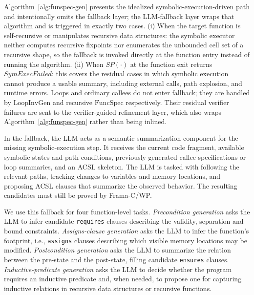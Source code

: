 \label{sec:llm-fallback}

\DIFaddbegin
Algorithm~\ref{alg:funspec-gen} presents the idealized symbolic-execution-driven path and intentionally omits the fallback layer; the LLM-fallback layer wraps that algorithm and is triggered in exactly two cases. (i) When the target function is self-recursive or manipulates recursive data structures: the symbolic executor neither computes recursive fixpoints nor enumerates the unbounded cell set of a recursive shape, so the fallback is invoked directly at the function entry instead of running the algorithm. (ii) When $\textit{SP}(\cdot)$ at the function exit returns $\textit{SymExecFailed}$: this covers the residual cases in which symbolic execution cannot produce a usable summary, including external calls, path explosion, and runtime errors. Loops and ordinary callees do not enter fallback; they are handled by $\mathrm{LoopInvGen}$ and recursive $\mathrm{FuncSpec}$ respectively. Their residual verifier failures are sent to the verifier-guided refinement layer, which also wraps Algorithm~\ref{alg:funspec-gen} rather than being inlined.
\DIFaddend

\DIFaddbegin
In the fallback, the LLM acts as a semantic summarization component for the missing symbolic‑execution step. It receives the current code fragment, available symbolic states and path conditions, previously generated callee specifications or loop summaries, and an ACSL skeleton. The LLM is tasked with following the relevant paths, tracking changes to variables and memory locations, and proposing ACSL clauses that summarize the observed behavior. The resulting candidates must still be proved by Frama‑C/WP. 
\DIFaddend


\DIFaddbegin
We use this fallback for four function-level tasks. \emph{Precondition generation} asks the LLM to infer candidate \texttt{requires} clauses describing the validity, separation and bound constraints. \emph{Assigns-clause generation} asks the LLM to infer the function's footprint, i.e., \texttt{assigns} clauses describing which visible memory locations may be modified. \emph{Postcondition generation} asks the LLM to summarize the relation between the pre-state and the post-state, filling candidate \texttt{ensures} clauses. \emph{Inductive-predicate generation} asks the LLM to decide whether the program requires an inductive predicate and, when needed, to propose one for capturing inductive relations in recursive data structures or recursive functions.
\DIFaddend


